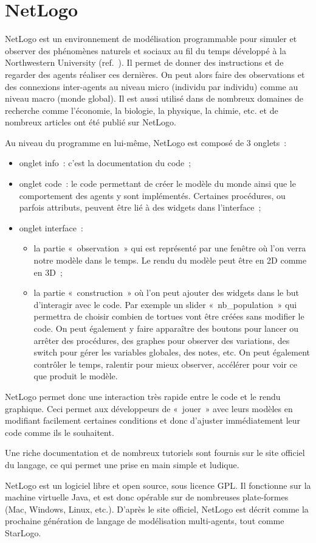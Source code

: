 \section{NetLogo}
\label{NetLogo}

NetLogo est un environnement de modélisation programmable pour simuler et observer des phénomènes naturels et sociaux au fil du temps développé à la Northwestern University (ref.~\cite{netlogo}). Il permet de donner des instructions et de regarder des agents réaliser ces dernières. On peut alors faire des observations et des connexions inter-agents au niveau micro (individu par individu) comme au niveau macro (monde global).
Il est aussi utilisé dans de nombreux domaines de recherche comme l'économie, la biologie, la physique, la chimie, etc. et de nombreux articles ont été publié sur NetLogo.

Au niveau du programme en lui-même, NetLogo est composé de 3 onglets~:
\begin{itemize}
	\item onglet info~: c'est la documentation du code~;
	\item onglet code~: le code permettant de créer le modèle du monde ainsi que le comportement des agents y sont implémentés. Certaines procédures, ou parfois attributs, peuvent être lié à des widgets dans l'interface~;
	\item onglet interface~:
          \begin{itemize}
          \item la partie «~observation~» qui est représenté par une fenêtre où l'on verra notre modèle dans le temps. Le rendu du modèle peut être en 2D comme en 3D~;
          \item la partie «~construction~» où l'on peut ajouter des widgets dans le but d’interagir avec le code. Par exemple un slider «~nb\_population~» qui permettra de choisir combien de tortues vont être créées sans modifier le code. On peut également y faire apparaître des boutons pour lancer ou arrêter des procédures, des graphes pour observer des variations, des switch pour gérer les variables globales, des notes, etc. On peut également contrôler le temps, ralentir pour mieux observer, accélérer pour voir ce que produit le modèle.
          \end{itemize}
\end{itemize}

NetLogo permet donc une interaction très rapide entre le code et le rendu graphique. Ceci permet aux développeurs de «~jouer~» avec leurs modèles en modifiant facilement certaines conditions et donc d'ajuster immédiatement leur code comme ils le souhaitent.

Une riche documentation et de nombreux tutoriels sont fournis sur le site officiel du langage, ce qui permet une prise en main simple et ludique.

NetLogo est un logiciel libre et open source, sous licence GPL. Il fonctionne sur la machine virtuelle Java, et est donc opérable sur de nombreuses plate-formes (Mac, Windows, Linux, etc.).
D'après le site officiel, NetLogo est décrit comme la prochaine génération de langage de modélisation multi-agents, tout comme StarLogo.
